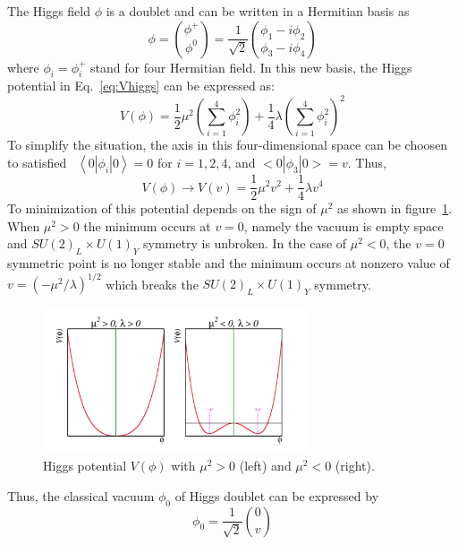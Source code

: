 The Higgs field $\phi$ is a doublet and can be written in a Hermitian basis as
\begin{equation}
	\phi = \binom{\phi^{+}}{\phi^{0}} = \frac{1}{\sqrt{2}} \binom{\phi_{1} - i\phi_{2}}{\phi_{3} - i\phi_{4}}
\end{equation}
where $\phi_{i} = \phi_{i}^{+}$ stand for four Hermitian field. 
In this new basis, the Higgs potential in Eq.~\ref{eq:Vhiggs} can be expressed as:
\begin{equation}
	V(\phi) = \frac{1}{2}\mu^{2}\left(\sum_{i=1}^{4}\phi_{i}^{2}\right) + \frac{1}{4}\lambda\left(\sum_{i=1}^{4}\phi_{i}^{2}\right)^{2}
\end{equation}
To simplify the situation, the axis in this four-dimensional space can be choosen to satisfied
~$\left<0\left| \phi_{i} \right|0\right> = 0$ for $i = 1, 2, 4$, and $<0\left| \phi_{3} \right|0> = v$. Thus,
\begin{equation}
	V(\phi) \rightarrow V(v) = \frac{1}{2}\mu^{2}v^{2} + \frac{1}{4}\lambda v^{4}
\end{equation}
To minimization of this potential depends on the sign of $\mu^{2}$ as shown in figure~\ref{fig:C2_Higgs_potential}.
When $\mu^{2} > 0$ the minimum occurs at $v = 0$, namely the vacuum is empty space and $SU(2)_{L} \times U(1)_{Y}$ symmetry is unbroken.
In the case of $\mu^{2} < 0$, the $v = 0$ symmetric point is no longer stable and the minimum occurs at nonzero value of 
$v = \left( -\mu^{2}/\lambda\right)^{1/2}$ which breaks the $SU(2)_{L} \times U(1)_{Y}$ symmetry.
\begin{figure}[!htb]
  \centering
  \includegraphics[width=0.7\textwidth]{figures/Theory/Vhiggs.png}
  \caption{Higgs potential $V(\phi)$ with $\mu^{2}>0$ (left) and $\mu^{2}<0$ (right).}
  \label{fig:C2_Higgs_potential}
\end{figure}
Thus, the classical vacuum $\phi_{0}$ of Higgs doublet can be expressed by
\begin{equation}
	\phi_{0} = \frac{1}{\sqrt{2}}\binom{0}{v}
\end{equation}
